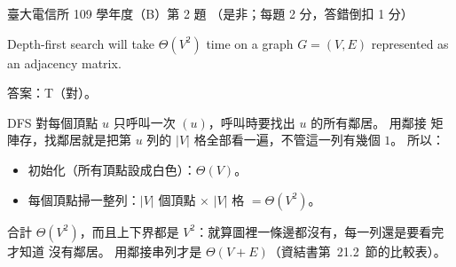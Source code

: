 \begin{pastexam}[label={px:ntu-109-comm-dsa-02}]{臺大電信所 109 學年度（B）第 2 題}
（是非；每題 2 分，答錯倒扣 1 分）

Depth-first search will take $\Theta(V^2)$ time on a graph $G=(V,E)$ represented as an adjacency
matrix.
\end{pastexam}

\begin{pastsoln}
答案：T（對）。

DFS 對每個頂點 $u$ 只呼叫一次 $(u)$，呼叫時要找出 $u$ 的所有鄰居。 用鄰接
矩陣存，找鄰居就是把第 $u$ 列的 $|V|$ 格全部看一遍，不管這一列有幾個 $1$。 所以：
\begin{itemize}
\item 初始化（所有頂點設成白色）：$\Theta(V)$。
\item 每個頂點掃一整列：$|V|$ 個頂點 $\times$ $|V|$ 格 $= \Theta(V^2)$。
\end{itemize}
合計 $\Theta(V^2)$，而且上下界都是 $V^2$：就算圖裡一條邊都沒有，每一列還是要看完才知道
沒有鄰居。 用鄰接串列才是 $\Theta(V + E)$（資結書第~21.2~節的比較表）。
\end{pastsoln}

